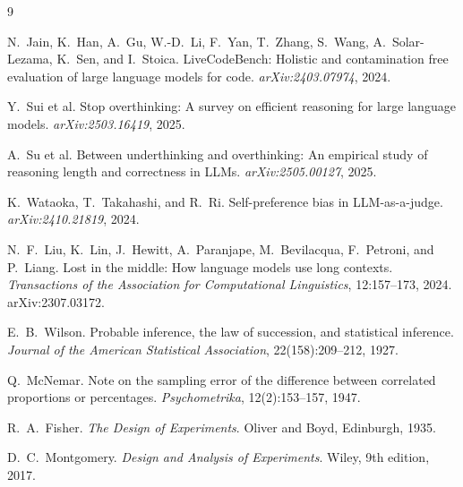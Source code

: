 \documentclass[11pt]{article}
\begin{document}
\begin{thebibliography}{9}\small

N.~Jain, K.~Han, A.~Gu, W.-D.~Li, F.~Yan, T.~Zhang, S.~Wang, A.~Solar-Lezama,
K.~Sen, and I.~Stoica.
\newblock LiveCodeBench: Holistic and contamination free evaluation of large
language models for code.
\newblock \emph{arXiv:2403.07974}, 2024.

Y.~Sui et al.
\newblock Stop overthinking: A survey on efficient reasoning for large
language models.
\newblock \emph{arXiv:2503.16419}, 2025.

A.~Su et al.
\newblock Between underthinking and overthinking: An empirical study of
reasoning length and correctness in LLMs.
\newblock \emph{arXiv:2505.00127}, 2025.

K.~Wataoka, T.~Takahashi, and R.~Ri.
\newblock Self-preference bias in LLM-as-a-judge.
\newblock \emph{arXiv:2410.21819}, 2024.

N.~F.~Liu, K.~Lin, J.~Hewitt, A.~Paranjape, M.~Bevilacqua, F.~Petroni, and
P.~Liang.
\newblock Lost in the middle: How language models use long contexts.
\newblock \emph{Transactions of the Association for Computational
Linguistics}, 12:157--173, 2024. arXiv:2307.03172.

E.~B.~Wilson.
\newblock Probable inference, the law of succession, and statistical
inference.
\newblock \emph{Journal of the American Statistical Association},
22(158):209--212, 1927.

Q.~McNemar.
\newblock Note on the sampling error of the difference between correlated
proportions or percentages.
\newblock \emph{Psychometrika}, 12(2):153--157, 1947.

R.~A.~Fisher.
\newblock \emph{The Design of Experiments}.
\newblock Oliver and Boyd, Edinburgh, 1935.

D.~C.~Montgomery.
\newblock \emph{Design and Analysis of Experiments}.
\newblock Wiley, 9th edition, 2017.

\end{thebibliography}
\end{document}
